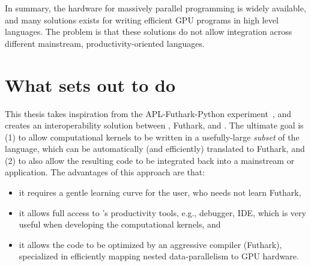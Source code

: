  

In summary, the hardware for massively parallel programming is widely available,
and many solutions exists for writing efficient GPU programs in high level
languages. The problem is that these solutions do not allow integration across
different mainstream, productivity-oriented languages.



\section{What \fshark{} sets out to do}

This thesis takes inspiration from the APL-Futhark-Python experiment~\cite{apltail}, 
and creates an interoperability solution between \fsharp{}, Futhark, and \csharp{}.
The ultimate goal is (1) to allow computational kernels to be written in a usefully-large
{\em subset} of the \fsharp{} language, which can be automatically (and efficiently)
translated to Futhark, and (2) to also allow the resulting code to be integrated
back into a mainstream \csharp{} or \fsharp{} application. 
The advantages of this approach are that:
\begin{itemize}
    \item it requires a gentle learning curve for the user, who needs not learn Futhark, 
    \item it allows full access to \fsharp{}'s productivity tools, e.g., debugger, IDE,
            which is very useful when developing the computational kernels, and 
    \item it allows the code to be optimized by an aggressive compiler (Futhark),
            specialized in efficiently mapping nested data-parallelism to GPU hardware.  
\end{itemize}


